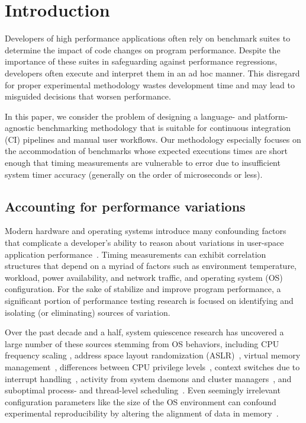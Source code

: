 \documentclass[conference]{IEEEtran}
\begin{document}
\IEEEpeerreviewmaketitle

\section{Introduction}
\label{sec:intro}

Developers of high performance applications often rely on benchmark suites to determine the
impact of code changes on program performance. Despite the importance of these suites in
safeguarding against performance regressions, developers often execute and interpret them in
an ad hoc manner. This disregard for proper experimental methodology wastes development time
and may lead to misguided decisions that worsen performance.

In this paper, we consider the problem of designing a language- and platform-agnostic
benchmarking methodology that is suitable for continuous integration (CI) pipelines and
manual user workflows. Our methodology especially focuses on the accommodation of benchmarks
whose expected executions times are short enough that timing measurements are vulnerable to
error due to insufficient system timer accuracy (generally on the order of microseconds
or less).

\subsection{Accounting for performance variations}
\label{sec:variations}

Modern hardware and operating systems introduce many confounding factors that complicate a
developer's ability to reason about variations in user-space application
performance~\cite{HP5e}. Timing measurements can exhibit correlation structures that depend
on a myriad of factors such as environment temperature, workload, power availability, and
network traffic, and operating system (OS) configuration. For the sake of stabilize and
improve program performance, a significant portion of performance testing research is
focused on identifying and isolating (or eliminating) sources of variation.

Over the past decade and a half, system quiescence research has uncovered a large number of
these sources stemming from OS behaviors, including CPU frequency scaling \cite{RHEL6},
address space layout randomization (ASLR)~\cite{Shacham2004}, virtual memory
management~\cite{Oyama2014,Oyama2016}, differences between CPU privilege
levels~\cite{Zaparanuks2009}, context switches due to interrupt handling~\cite{Tsafrir2007},
activity from system daemons and cluster managers~\cite{Petrini2003}, and suboptimal
process- and thread-level scheduling~\cite{Lozi2016}. Even seemingly irrelevant
configuration parameters like the size of the OS environment can confound experimental
reproducibility by altering the alignment of data in memory~\cite{Mytkowicz2009}.
\end{document}
